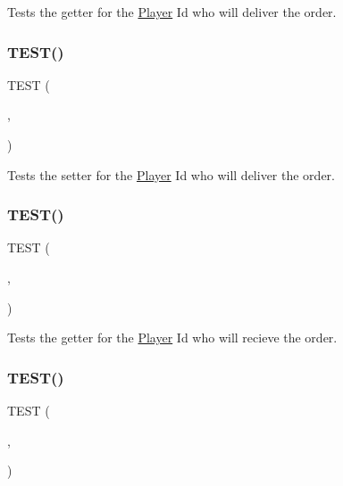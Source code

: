 Tests the getter for the \hyperlink{classPlayer}{Player} Id who will deliver the order. \mbox{\label{group__group2_ga6f2b7ec37bf6230c01a887ee1c49a8cb}} 
\subsubsection{\texorpdfstring{T\+E\+S\+T()}{TEST()}\hspace{0.1cm}{\footnotesize\ttfamily [43/54]}}
{\footnotesize\ttfamily T\+E\+ST (\begin{DoxyParamCaption}\item[{order\+Test}]{,  }\item[{set\+From\+Player\+Id\+Test}]{ }\end{DoxyParamCaption})}

Tests the setter for the \hyperlink{classPlayer}{Player} Id who will deliver the order. \mbox{\label{group__group2_ga952832d059d6de1a958b81701e0bb7ed}} 
\subsubsection{\texorpdfstring{T\+E\+S\+T()}{TEST()}\hspace{0.1cm}{\footnotesize\ttfamily [44/54]}}
{\footnotesize\ttfamily T\+E\+ST (\begin{DoxyParamCaption}\item[{order\+Test}]{,  }\item[{get\+To\+Player\+Id\+Test}]{ }\end{DoxyParamCaption})}

Tests the getter for the \hyperlink{classPlayer}{Player} Id who will recieve the order. \mbox{\label{group__group2_ga0b7c397d9be139038856dccc5a3269cb}} 
\subsubsection{\texorpdfstring{T\+E\+S\+T()}{TEST()}\hspace{0.1cm}{\footnotesize\ttfamily [45/54]}}
{\footnotesize\ttfamily T\+E\+ST (\begin{DoxyParamCaption}\item[{order\+Test}]{,  }\item[{set\+To\+Player\+Id\+Test}]{ }\end{DoxyParamCaption})}

